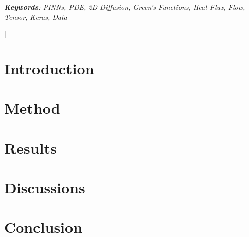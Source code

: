 \documentclass[letterpaper,11.8pt, twocolumn]{article}
\begin{document}
\begin{@twocolumnfalse}
\textit{\textbf{Keywords}: PINNs, PDE, 2D Diffusion, Green's Functions, Heat Flux, Flow, Tensor, Keras, Data}


\vspace{1cm}
\end{@twocolumnfalse}]
\section{Introduction}\label{s:in}
    
    
\section{Method}\label{s:sc}
    

\section{Results}\label{s:rs}
    

\section{Discussions}\label{s:ds}
    
       
\section{Conclusion}\label{s:co}
    
\hypersetup{linkcolor=false}
\balance
\listoffigures
\printbibliography
\end{document}
